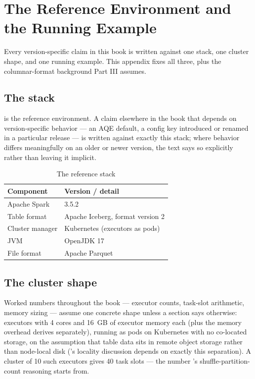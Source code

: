 \chapter{The Reference Environment and the Running Example}
\label{app:refenv}

Every version-specific claim in this book is written against one stack, one
cluster shape, and one running example. This appendix fixes all three, plus
the columnar-format background Part III assumes.

\section{The stack}
\label{sec:refenv-stack}

 is the reference environment. A claim elsewhere in
the book that depends on version-specific behavior --- an AQE default, a
config key introduced or renamed in a particular release --- is written
against exactly this stack; where behavior differs meaningfully on an older
or newer version, the text says so explicitly rather than leaving it
implicit.

\begin{table}[htbp]
\centering
\caption{The reference stack}
\label{tab:refenv-stack}
\begin{tabular}{@{}ll@{}}
\toprule
\textbf{Component} & \textbf{Version / detail} \\
\midrule
Apache Spark & 3.5.2 \\
Table format & Apache Iceberg, format version 2 \\
Cluster manager & Kubernetes (executors as pods) \\
JVM & OpenJDK 17 \\
File format & Apache Parquet \\
\bottomrule
\end{tabular}
\end{table}

\section{The cluster shape}
\label{sec:refenv-cluster}

Worked numbers throughout the book --- executor counts, task-slot arithmetic,
memory sizing --- assume one concrete shape unless a section says otherwise:
executors with 4 cores and 16~GB of executor memory each (plus the memory
overhead  derives separately), running as pods on
Kubernetes with no co-located storage, on the assumption that table data sits in remote object storage rather
than node-local disk ('s locality
discussion depends on exactly this separation). A cluster of 10 such
executors gives 40 task slots --- the number 's
shuffle-partition-count reasoning starts from.

